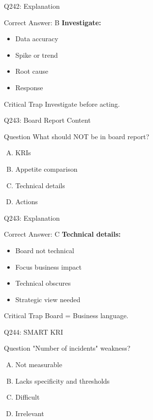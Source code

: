 \documentclass{beamer}
\begin{document}
	\begin{frame}{Q242: Explanation}
		\begin{block}{Correct Answer: B}
			\textbf{Investigate:}
			\begin{itemize}
				\item Data accuracy
				\item Spike or trend
				\item Root cause
				\item Response
			\end{itemize}
		\end{block}
		\begin{alertblock}{Critical Trap}
			Investigate before acting.
		\end{alertblock}
	\end{frame}
	
	\begin{frame}{Q243: Board Report Content}
		\begin{block}{Question}
			What should NOT be in board report?
		\end{block}
		\begin{enumerate}[(A)]
			\item KRIs
			\item Appetite comparison
			\item Technical details
			\item Actions
		\end{enumerate}
	\end{frame}
	
	\begin{frame}{Q243: Explanation}
		\begin{block}{Correct Answer: C}
			\textbf{Technical details:}
			\begin{itemize}
				\item Board not technical
				\item Focus business impact
				\item Technical obscures
				\item Strategic view needed
			\end{itemize}
		\end{block}
		\begin{alertblock}{Critical Trap}
			Board = Business language.
		\end{alertblock}
	\end{frame}
	
	\begin{frame}{Q244: SMART KRI}
		\begin{block}{Question}
			"Number of incidents" weakness?
		\end{block}
		\begin{enumerate}[(A)]
			\item Not measurable
			\item Lacks specificity and thresholds
			\item Difficult
			\item Irrelevant
		\end{enumerate}
	\end{frame}
	
\end{document}
